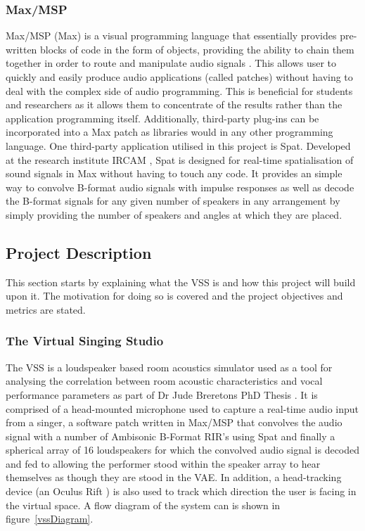\documentclass[../../main.tex]{subfiles}
\begin{document}
	\subsubsection{Max/MSP}
		Max/MSP (Max) is a visual programming language that essentially provides pre-written blocks of code in the form of objects, providing the ability to chain them together in order to route and manipulate audio signals \cite{max}. This allows user to quickly and easily produce audio applications (called patches) without having to deal with the complex side of audio programming. This is beneficial for students and researchers as it allows them to concentrate of the results rather than the application programming itself. Additionally, third-party plug-ins can be incorporated into a Max patch as libraries would in any other programming language. One third-party application utilised in this project is Spat. Developed at the research institute IRCAM \cite{spat}, Spat is designed for real-time spatialisation of sound signals in Max without having to touch any code. It provides an simple way to convolve B-format audio signals with impulse responses as well as decode the B-format signals for any given number of speakers in any arrangement by simply providing the number of speakers and angles at which they are placed.


\subsection{Project Description}
	
	This section starts by explaining what the \ac{VSS} is and how this project will build upon it. The motivation for doing so is covered and the project objectives and metrics are stated.

	\subsubsection{The Virtual Singing Studio}

		The \ac{VSS} is a loudspeaker based room acoustics simulator used as a tool for analysing the correlation between room acoustic characteristics and vocal performance parameters as part of Dr Jude Breretons PhD Thesis \cite{Brereton2014}. It is comprised of a head-mounted microphone used to capture a real-time audio input from a singer, a software patch written in Max/MSP that convolves the audio signal with a number of Ambisonic B-Format \ac{RIR}'s using Spat and finally a spherical array of 16 loudspeakers for which the convolved audio signal is decoded and fed to allowing the performer stood within the speaker array to hear themselves as though they are stood in the \ac{VAE}. In addition, a head-tracking device (an Oculus Rift \cite{oculus}) is also used to track which direction the user is facing in the virtual space. A flow diagram of the system can is shown in figure~\ref{vssDiagram}.
\end{document}
